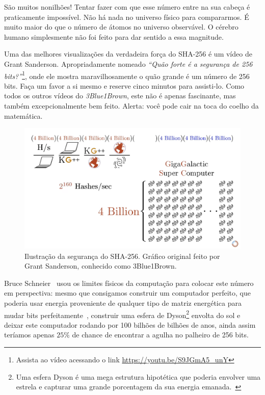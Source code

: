 São muitos nonilhões! Tentar fazer com que esse número entre na sua cabeça é praticamente impossível. Não há nada no universo físico para compararmos. É muito maior do que o número de átomos no universo observável. O cérebro humano simplesmente não foi feito para dar sentido a essa magnitude.

\newpage

Uma das melhores visualizações da verdadeira força do SHA-256 é um vídeo de Grant Sanderson. Apropriadamente nomeado \textit{\enquote{Quão forte é a segurança de 256 bits?}}\footnote{Assista ao vídeo acessando o link \url{https://youtu.be/S9JGmA5_unY}}, onde ele mostra maravilhosamente o quão grande é um número de 256 bits. Faça um favor a si mesmo e reserve cinco minutos para assisti-lo. Como todos os outros vídeos do \textit{3Blue1Brown}, este não é apenas fascinante, mas também excepcionalmente bem feito. Alerta: você pode cair na toca do coelho da matemática.

\begin{figure}
  \includegraphics{assets/images/youtube-vid-inverted.png}
  \caption{Ilustração da segurança do SHA-256. Gráfico original feito por Grant Sanderson, conhecido como 3Blue1Brown.}
  \label{fig:youtube-vid-inverted}
\end{figure}

Bruce Schneier~\cite{web:schneier} usou os limites físicos da computação para colocar este número em perspectiva: mesmo que consigamos construir um computador perfeito, que poderia usar energia proveniente de qualquer tipo de matriz energética para mudar bits perfeitamente~\cite{wiki:landauer}, construir uma esfera de Dyson\footnote{Uma esfera Dyson é uma mega estrutura hipotética que poderia envolver uma estrela e capturar uma grande porcentagem da sua energia emanada.~\cite{wiki:dyson}} envolta do sol e deixar este computador rodando por 100 bilhões de bilhões de anos, ainda assim teríamos apenas $25\%$ de chance de encontrar a agulha no palheiro de 256 bits.


